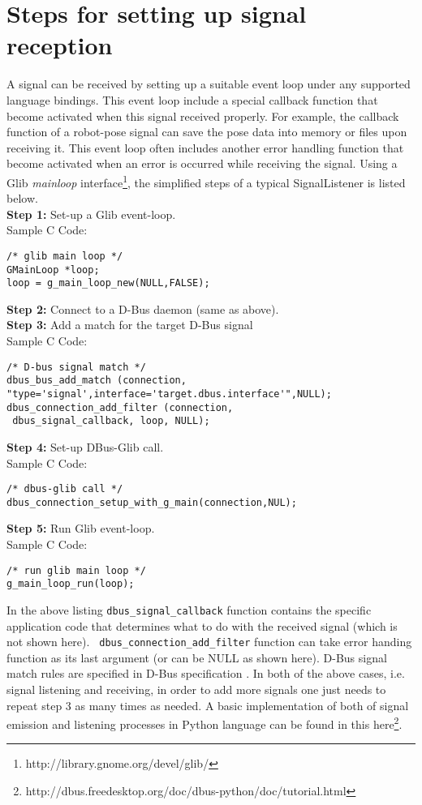 \section{Steps for setting up signal reception} 
A signal can be received by setting up a suitable event loop under any supported language bindings. This event loop include a special callback function that become activated when this signal received properly. For example, the callback function of a robot-pose signal can save the pose data into memory or files upon receiving it. This event loop often includes another error handling function that become activated when an error is occurred while receiving the signal. Using a Glib {\em mainloop} interface\footnote{http://library.gnome.org/devel/glib/}, the simplified steps of a typical SignalListener is listed below.\\
\textbf{Step 1:} Set-up a Glib event-loop.\\
Sample C Code:
\begin{lstlisting} 
/* glib main loop */
GMainLoop *loop;
loop = g_main_loop_new(NULL,FALSE);
\end{lstlisting} 
\textbf{Step 2:} Connect to a D-Bus daemon (same as above).\\
\textbf{Step 3:} Add a match for the target D-Bus signal\\
Sample C Code:
\begin{lstlisting} 
/* D-bus signal match */
dbus_bus_add_match (connection,
"type='signal',interface='target.dbus.interface'",NULL);
dbus_connection_add_filter (connection, 
 dbus_signal_callback, loop, NULL);
\end{lstlisting} 
\textbf{Step 4:} Set-up DBus-Glib call.\\
Sample C Code:
\begin{lstlisting} 
/* dbus-glib call */
dbus_connection_setup_with_g_main(connection,NUL);
\end{lstlisting} 
\textbf{Step 5:} Run Glib event-loop.\\
Sample C Code:
\begin{lstlisting} 
/* run glib main loop */
g_main_loop_run(loop);
\end{lstlisting} 
In the above listing \texttt{dbus\_signal\_callback} function contains the specific application code that determines what to do with the received signal (which is not shown here). \texttt{ dbus\_connection\_add\_filter} function can take error handing function as its last argument (or can be NULL as shown here). D-Bus signal match rules are specified in D-Bus specification \cite{Pennington+2010}. In both of the above cases, i.e. signal listening and receiving, in order to add more signals one just needs to repeat step 3  as many times as needed. A basic implementation of both of signal emission and listening processes in Python language can be found in this here\footnote{http://dbus.freedesktop.org/doc/dbus-python/doc/tutorial.html}.
